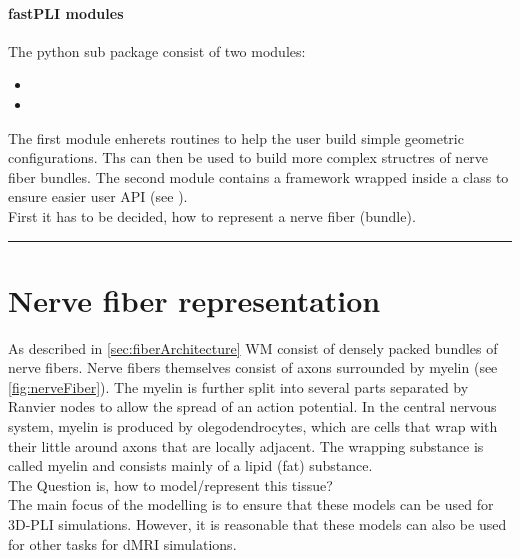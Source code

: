 \paragraph{\ac{fastPLI} modules}
% 
The python sub package  consist of two modules:
% 
\begin{itemize}[nosep]
    \item {}
    \item {}
\end{itemize}
% 
The first module  enherets routines to help the user build simple geometric configurations.
Ths can then be used to build more complex structres of nerve fiber bundles.
The second module  contains a \CXX framework wrapped inside a \python class to ensure easier user \ac{API} (see \dummy).
\\
% 
First it has to be decided, how to represent a nerve fiber (bundle).
% 
\vspace{5pt}
\hrule
\vspace{6pt}
% 
\section{Nerve fiber representation}
% 
As described in \cref{sec:fiberArchitecture} \ac{WM} consist of densely packed bundles of nerve fibers.
Nerve fibers themselves consist of axons surrounded by myelin (see \cref{fig:nerveFiber}).
The myelin is further split into several parts separated by Ranvier nodes to allow the spread of an action potential.
In the central nervous system, myelin is produced by olegodendrocytes, which are cells that wrap with their little  around axons that are locally adjacent.
The wrapping substance is called myelin and consists mainly of a lipid (fat) substance.
\\
% 
The Question is, how to model/represent this tissue?
\\
% 
The main focus of the modelling is to ensure that these models can be used for \ac{3D-PLI} simulations.
However, it is reasonable that these models can also be used for other tasks \eg for \ac{dMRI} simulations.
% 
